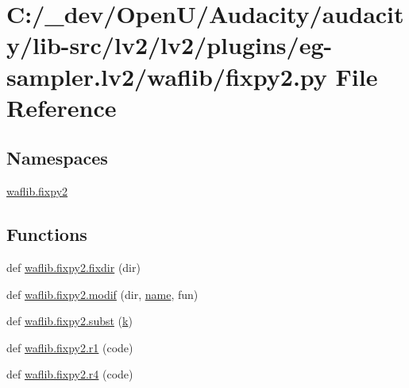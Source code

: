 \hypertarget{lv2_2plugins_2eg-sampler_8lv2_2waflib_2fixpy2_8py}{}\section{C\+:/\+\_\+dev/\+Open\+U/\+Audacity/audacity/lib-\/src/lv2/lv2/plugins/eg-\/sampler.lv2/waflib/fixpy2.py File Reference}
\label{lv2_2plugins_2eg-sampler_8lv2_2waflib_2fixpy2_8py}
\subsection*{Namespaces}
\begin{DoxyCompactItemize}
\item 
 \hyperlink{namespacewaflib_1_1fixpy2}{waflib.\+fixpy2}
\end{DoxyCompactItemize}
\subsection*{Functions}
\begin{DoxyCompactItemize}
\item 
def \hyperlink{namespacewaflib_1_1fixpy2_ab553b609bb1e5be9704eaa0018947909}{waflib.\+fixpy2.\+fixdir} (dir)
\item 
def \hyperlink{namespacewaflib_1_1fixpy2_a4c821ce0a3eff8e4ccbbf9daa9648270}{waflib.\+fixpy2.\+modif} (dir, \hyperlink{lib_2expat_8h_a1b49b495b59f9e73205b69ad1a2965b0}{name}, fun)
\item 
def \hyperlink{namespacewaflib_1_1fixpy2_a5f7f3e2b61180292e779e171dc5a1dbf}{waflib.\+fixpy2.\+subst} (\hyperlink{rfft2d_test_m_l_8m_adc468c70fb574ebd07287b38d0d0676d}{k})
\item 
def \hyperlink{namespacewaflib_1_1fixpy2_a721a8f58a4734bba827b4f6d985f98ff}{waflib.\+fixpy2.\+r1} (code)
\item 
def \hyperlink{namespacewaflib_1_1fixpy2_a3e64c393bc3c2aacf327ab18d56dd7ef}{waflib.\+fixpy2.\+r4} (code)
\end{DoxyCompactItemize}
